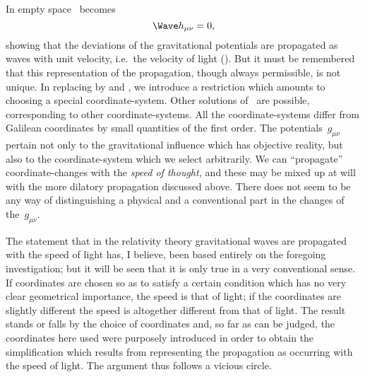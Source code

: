\documentclass[12pt]{book}
\begin{document}
In empty space ~becomes
\[
\Wave h_{\mu\nu} = 0,
\]
showing that the deviations of the gravitational potentials are propagated
as waves with unit velocity, i.e.\ the velocity of light (). But it must be
%
remembered that this representation of the propagation, though always permissible,
%
is not unique. In replacing  by  and , we introduce
a restriction which amounts to choosing a special coordinate\hyp{}system. Other
solutions of~ are possible, corresponding to other coordinate\hyp{}systems.
All the coordinate\hyp{}systems differ from Galilean coordinates by small quantities
of the first order. The potentials~$g_{\mu\nu}$ pertain not only to the gravitational
influence which has objective reality, but also to the coordinate\hyp{}system which
we select arbitrarily. We can ``propagate'' coordinate\hyp{}changes with the
\emph{speed of thought,} and these may be mixed up at will with the more dilatory
propagation discussed above. There does not seem to be any way of distinguishing
a physical and a conventional part in the changes of the~$g_{\mu\nu}$.

The statement that in the relativity theory gravitational waves are propagated
with the speed of light has, I believe, been based entirely on the
foregoing investigation; but it will be seen that it is only true in a very
conventional sense. If coordinates are chosen so as to satisfy a certain condition
which has no very clear geometrical importance, the speed is that of
light; if the coordinates are slightly different the speed is altogether different
from that of light. The result stands or falls by the choice of coordinates and,
so far as can be judged, the coordinates here used were purposely introduced
in order to obtain the simplification which results from representing the
propagation as occurring with the speed of light. The argument thus follows
a vicious circle.
\end{document}
